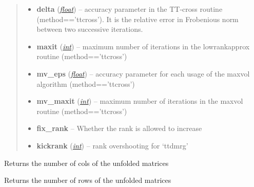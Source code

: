 \documentclass[a4paper,10pt,english]{sphinxmanual}
\begin{document}
\begin{fulllineitems}
\begin{fulllineitems}
\begin{quote}
\begin{description}
\begin{itemize}
\item {} 
\textbf{delta} (\href{http://docs.python.org/library/functions.html\#float}{\emph{float}}) -- accuracy parameter in the TT-cross routine (method=='ttcross'). It is the relative error in Frobenious norm between two successive iterations.

\item {} 
\textbf{maxit} (\href{http://docs.python.org/library/functions.html\#int}{\emph{int}}) -- maximum number of iterations in the lowrankapprox routine (method=='ttcross')

\item {} 
\textbf{mv\_eps} (\href{http://docs.python.org/library/functions.html\#float}{\emph{float}}) -- accuracy parameter for each usage of the maxvol algorithm (method=='ttcross')

\item {} 
\textbf{mv\_maxit} (\href{http://docs.python.org/library/functions.html\#int}{\emph{int}}) -- maximum number of iterations in the maxvol routine (method=='ttcross')

\item {} 
\textbf{fix\_rank} -- Whether the rank is allowed to increase

\item {} 
\textbf{kickrank} (\href{http://docs.python.org/library/functions.html\#int}{\emph{int}}) -- rank overshooting for `ttdmrg'

\end{itemize}

\end{description}\end{quote}

\end{fulllineitems}


\begin{fulllineitems}
\label{api-qttmat:TensorToolbox.core.QTTmat.get_full_ncols}
Returns the number of cols of the unfolded matrices

\end{fulllineitems}


\begin{fulllineitems}
\label{api-qttmat:TensorToolbox.core.QTTmat.get_full_nrows}
Returns the number of rows of the unfolded matrices


\end{fulllineitems}
\end{fulllineitems}
\end{document}
